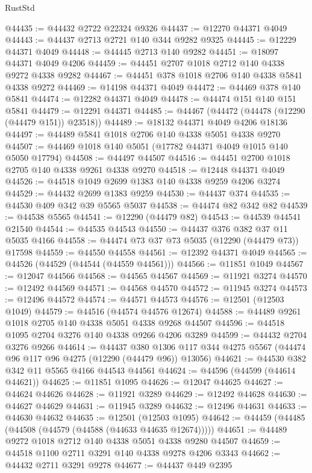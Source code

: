 \begin{lexlean}{RustStd}
\begin{coremodule}
@44435 := @44432 @2722 @22324 @9326
@44437 := @12270 @44371 @4049
@44443 := @44437 @2713 @2721 @140 @344 @9282 @9325
@44445 := @12229 @44371 @4049
@44448 := @44445 @2713 @140 @9282
@44451 := @18097 @44371 @4049 @4206
@44459 := @44451 @2707 @1018 @2712 @140 @4338 @9272 @4338 @9282
@44467 := @44451 @378 @1018 @2706 @140 @4338 @5841 @4338 @9272
@44469 := @14198 @44371 @4049
@44472 := @44469 @378 @140 @5841
@44474 := @12282 @44371 @4049
@44478 := @44474 @151 @140 @151 @5841
@44479 := @12291 @44371
@44485 := @44467 (@44472 (@44478 (@12290 (@44479 @151)) @23518))
@44489 := @18132 @44371 @4049 @4206 @18136
@44497 := @44489 @5841 @1018 @2706 @140 @4338 @5051 @4338 @9270
@44507 := @44469 @1018 @140 @5051 (@17782 @44371 @4049 @1015 @140 @5050 @17794)
@44508 := @44497 @44507
@44516 := @44451 @2700 @1018 @2705 @140 @4338 @9261 @4338 @9270
@44518 := @12448 @44371 @4049
@44526 := @44518 @1049 @2699 @1383 @140 @4338 @9259 @4206 @3274
@44529 := @44432 @2699 @1383 @9259
@44530 := @44437 @374
@44535 := @44530 @409 @342 @39 @5565 @5037
@44538 := @44474 @82 @342 @82
@44539 := @44538 @5565
@44541 := @12290 (@44479 @82)
@44543 := @44539 @44541 @21540
@44544 := @44535 @44543
@44550 := @44437 @376 @382 @37 @11 @5035 @4166
@44558 := @44474 @73 @37 @73 @5035 (@12290 (@44479 @73)) @17598
@44559 := @44550 @44558
@44561 := @12392 @44371 @4049
@44565 := @44526 (@44529 (@44544 (@44559 @44561)))
@44566 := @11851 @1049
@44567 := @12047 @44566
@44568 := @44565 @44567
@44569 := @11921 @3274
@44570 := @12492 @44569
@44571 := @44568 @44570
@44572 := @11945 @3274
@44573 := @12496 @44572
@44574 := @44571 @44573
@44576 := @12501 (@12503 @1049)
@44579 := @44516 (@44574 @44576 @12674)
@44588 := @44489 @9261 @1018 @2705 @140 @4338 @5051 @4338 @9268 @44507
@44596 := @44518 @1095 @2704 @3276 @140 @4338 @9266 @4206 @3289
@44599 := @44432 @2704 @3276 @9266
@44614 := @44437
    @380
    @1306
    @117
    @344
    @4275
    @5567
    (@44474 @96 @117 @96 @4275 (@12290 (@44479 @96)) @13056)
@44621 := @44530 @382 @342 @11 @5565 @4166 @44543 @44561
@44624 := @44596 (@44599 (@44614 @44621))
@44625 := @11851 @1095
@44626 := @12047 @44625
@44627 := @44624 @44626
@44628 := @11921 @3289
@44629 := @12492 @44628
@44630 := @44627 @44629
@44631 := @11945 @3289
@44632 := @12496 @44631
@44633 := @44630 @44632
@44635 := @12501 (@12503 @1095)
@44642 := @44459 (@44485 (@44508 (@44579 (@44588 (@44633 @44635 @12674)))))
@44651 := @44489 @9272 @1018 @2712 @140 @4338 @5051 @4338 @9280 @44507
@44659 := @44518 @1100 @2711 @3291 @140 @4338 @9278 @4206 @3343
@44662 := @44432 @2711 @3291 @9278
@44677 := @44437
    @449
    @2395

\end{coremodule}
\end{lexlean}
